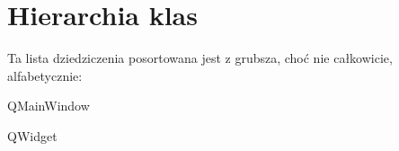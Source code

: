 \section{Hierarchia klas}
Ta lista dziedziczenia posortowana jest z grubsza, choć nie całkowicie, alfabetycznie\-:\begin{DoxyCompactList}
\item Q\-Main\-Window\begin{DoxyCompactList}
\item {}
\end{DoxyCompactList}
\item Q\-Widget\begin{DoxyCompactList}
\item {}
\item {}
\end{DoxyCompactList}
\item {}
\end{DoxyCompactList}
